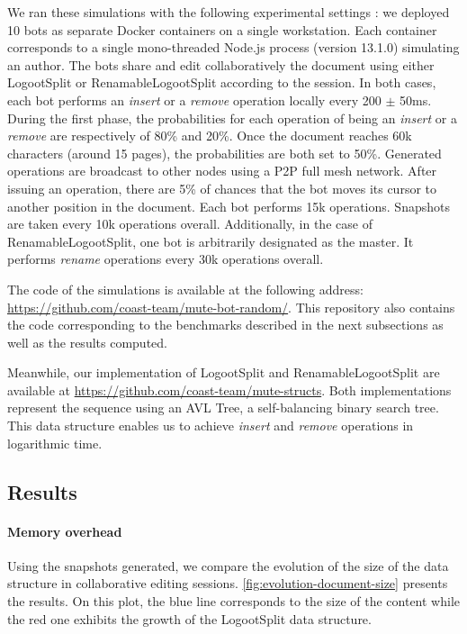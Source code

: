 \documentclass[sigplan,10pt]{acmart}
\begin{document}
We ran these simulations with the following experimental settings : we deployed 10 bots as separate Docker containers on a single workstation.
Each container corresponds to a single mono-threaded Node.js process (version 13.1.0) simulating an author.
The bots share and edit collaboratively the document using either LogootSplit or RenamableLogootSplit according to the session.
In both cases, each bot performs an \emph{insert} or a \emph{remove} operation locally every 200 $\pm$ 50ms.
During the first phase, the probabilities for each operation of being an \emph{insert} or a \emph{remove} are respectively of 80\% and 20\%.
Once the document reaches 60k characters (around 15 pages), the probabilities are both set to 50\%.
Generated operations are broadcast to other nodes using a \ac{P2P} full mesh network.
After issuing an operation, there are 5\% of chances that the bot moves its cursor to another position in the document.
Each bot performs 15k operations.
Snapshots are taken every 10k operations overall.
Additionally, in the case of RenamableLogootSplit, one bot is arbitrarily designated as the master.
It performs \emph{rename} operations every 30k operations overall.

The code of the simulations is available at the following address: \url{https://github.com/coast-team/mute-bot-random/}.
This repository also contains the code corresponding to the benchmarks described in the next subsections as well as the results computed.

\begin{sloppypar}
Meanwhile, our implementation of LogootSplit and RenamableLogootSplit are available at \url{https://github.com/coast-team/mute-structs}.
Both implementations represent the sequence using an AVL Tree, a self-balancing binary search tree.
This data structure enables us to achieve \emph{insert} and \emph{remove} operations in logarithmic time.
\end{sloppypar}

\subsection{Results}

\paragraph{Memory overhead}

Using the snapshots generated, we compare the evolution of the size of the data structure in collaborative editing sessions.
\autoref{fig:evolution-document-size} presents the results.
On this plot, the blue line corresponds to the size of the content while the red one exhibits the growth of the LogootSplit data structure.
\end{document}
